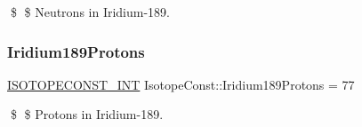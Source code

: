 \$ \$ Neutrons in Iridium-\/189. \mbox{\label{group___isotope_const-_iridium-_ir189_ga6d6fa92e3a2c3a111151f03d408d28df}} 
\subsubsection{\texorpdfstring{Iridium189\+Protons}{Iridium189Protons}}
{\footnotesize\ttfamily \mbox{\hyperlink{group___isotope_const-_macros_ga5f18360b3e99483a35c32d789e62621c}{I\+S\+O\+T\+O\+P\+E\+C\+O\+N\+S\+T\+\_\+\+I\+NT}} Isotope\+Const\+::\+Iridium189\+Protons = 77}

\$ \$ Protons in Iridium-\/189. 